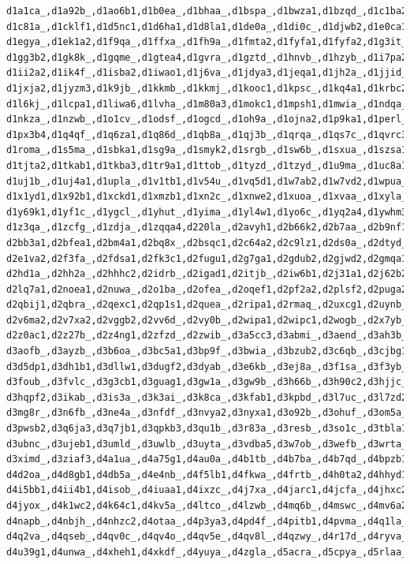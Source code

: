 \documentclass[letter,center,fleqn]{NAR}
\begin{document}
\begin{verbatim}
d1a1ca_,d1a92b_,d1ao6b1,d1b0ea_,d1bhaa_,d1bspa_,d1bwza1,d1bzqd_,d1c1ba2,d1c3pa_,
d1c81a_,d1cklf1,d1d5nc1,d1d6ha1,d1d8la1,d1de0a_,d1di0c_,d1djwb2,d1e0ca1,d1e9ha_,
d1egya_,d1ek1a2,d1f9qa_,d1ffxa_,d1fh9a_,d1fmta2,d1fyfa1,d1fyfa2,d1g3it_,d1g63i_,
d1gg3b2,d1gk8k_,d1gqme_,d1gtea4,d1gvra_,d1gztd_,d1hnvb_,d1hzyb_,d1i7pa2,d1ia2a_,
d1ii2a2,d1ik4f_,d1isba2,d1iwao1,d1j6va_,d1jdya3,d1jeqa1,d1jh2a_,d1jjid_,d1jrqb2,
d1jxja2,d1jyzm3,d1k9jb_,d1kkmb_,d1kkmj_,d1kooc1,d1kpsc_,d1kq4a1,d1krbc2,d1ksda1,
d1l6kj_,d1lcpa1,d1liwa6,d1lvha_,d1m80a3,d1mokc1,d1mpsh1,d1mwia_,d1ndqa_,d1ni6c_,
d1nkza_,d1nzwb_,d1o1cv_,d1odsf_,d1ogcd_,d1oh9a_,d1ojna2,d1p9ka1,d1perl_,d1pf9i3,
d1px3b4,d1q4qf_,d1q6za1,d1q86d_,d1qb8a_,d1qj3b_,d1qrqa_,d1qs7c_,d1qvrc3,d1r67a1,
d1roma_,d1s5ma_,d1sbka1,d1sg9a_,d1smyk2,d1srgb_,d1sw6b_,d1sxua_,d1szsa1,d1th8a1,
d1tjta2,d1tkab1,d1tkba3,d1tr9a1,d1ttob_,d1tyzd_,d1tzyd_,d1u9ma_,d1uc8a1,d1uf5a_,
d1uj1b_,d1uj4a1,d1upla_,d1v1tb1,d1v54u_,d1vq5d1,d1w7ab2,d1w7vd2,d1wpua_,d1x0sa_,
d1x1yd1,d1x92b1,d1xckd1,d1xmzb1,d1xn2c_,d1xnwe2,d1xuoa_,d1xvaa_,d1xyla_,d1y3be2,
d1y69k1,d1yf1c_,d1ygcl_,d1yhut_,d1yima_,d1yl4w1,d1yo6c_,d1yq2a4,d1ywhm3,d1z25a3,
d1z3qa_,d1zcfg_,d1zdja_,d1zqqa4,d220la_,d2avyh1,d2b66k2,d2b7aa_,d2b9nf1,d2b9no1,
d2bb3a1,d2bfea1,d2bm4a1,d2bq8x_,d2bsqc1,d2c64a2,d2c9lz1,d2ds0a_,d2dtyd_,d2dxia2,
d2e1va2,d2f3fa_,d2fdsa1,d2fk3c1,d2fugu1,d2g7ga1,d2gdub2,d2gjwd2,d2gmqa1,d2hbxb_,
d2hd1a_,d2hh2a_,d2hhhc2,d2idrb_,d2igad1,d2itjb_,d2iw6b1,d2j31a1,d2j62b2,d2juaa1,
d2lq7a1,d2noea1,d2nuwa_,d2o1ba_,d2ofea_,d2oqef1,d2pf2a2,d2plsf2,d2puga2,d2q7qh_,
d2qbij1,d2qbra_,d2qexc1,d2qp1s1,d2quea_,d2ripa1,d2rmaq_,d2uxcg1,d2uynb_,d2v4eg_,
d2v6ma2,d2v7xa2,d2vggb2,d2vv6d_,d2vy0b_,d2wipa1,d2wipc1,d2wogb_,d2x7yb_,d2yzdg1,
d2z0ac1,d2z27b_,d2z4ng1,d2zfzd_,d2zwib_,d3a5cc3,d3abmi_,d3aend_,d3ah3b_,d3anzi1,
d3aofb_,d3ayzb_,d3b6oa_,d3bc5a1,d3bp9f_,d3bwia_,d3bzub2,d3c6qb_,d3cjbg1,d3cojc2,
d3d5dp1,d3dh1b1,d3dllw1,d3dugf2,d3dyab_,d3e6kb_,d3ej8a_,d3f1sa_,d3f3yb_,d3flqa_,
d3foub_,d3fvlc_,d3g3cb1,d3guag1,d3gw1a_,d3gw9b_,d3h66b_,d3h90c2,d3hjjc_,d3hlib_,
d3hqpf2,d3ikab_,d3is3a_,d3k3ai_,d3k8ca_,d3kfab1,d3kpbd_,d3l7uc_,d3l7zd2,d3m5ka_,
d3mg8r_,d3n6fb_,d3ne4a_,d3nfdf_,d3nvya2,d3nyxa1,d3o92b_,d3ohuf_,d3om5a_,d3ozqa1,
d3pwsb2,d3q6ja3,d3q7jb1,d3qpkb3,d3qu1b_,d3r83a_,d3resb_,d3so1c_,d3tbla1,d3tcrb_,
d3ubnc_,d3ujeb1,d3umld_,d3uwlb_,d3uyta_,d3vdba5,d3w7ob_,d3wefb_,d3wrta_,d3wyla_,
d3ximd_,d3ziaf3,d4a1ua_,d4a75g1,d4au0a_,d4b1tb_,d4b7ba_,d4b7qd_,d4bpzb1,d4cqli_,
d4d2oa_,d4d8gb1,d4db5a_,d4e4nb_,d4f5lb1,d4fkwa_,d4frtb_,d4h0ta2,d4hhyd1,d4hx6a1,
d4i5bb1,d4ii4b1,d4isob_,d4iuaa1,d4ixzc_,d4j7xa_,d4jarc1,d4jcfa_,d4jhxc2,d4jyka2,
d4jyox_,d4k1wc2,d4k64c1,d4kv5a_,d4ltco_,d4lzwb_,d4mq6b_,d4mswc_,d4mv6a2,d4mw5b1,
d4napb_,d4nbjh_,d4nhzc2,d4otaa_,d4p3ya3,d4pd4f_,d4pitb1,d4pvma_,d4q1la_,d4q1sy_,
d4q2va_,d4qseb_,d4qv0c_,d4qv4o_,d4qv5e_,d4qv8l_,d4qzwy_,d4r17d_,d4ryva_,d4tvab4,
d4u39g1,d4unwa_,d4xheh1,d4xkdf_,d4yuya_,d4zgla_,d5acra_,d5cpya_,d5rlaa_,d7ccpa_
\end{verbatim}
\end{document}
